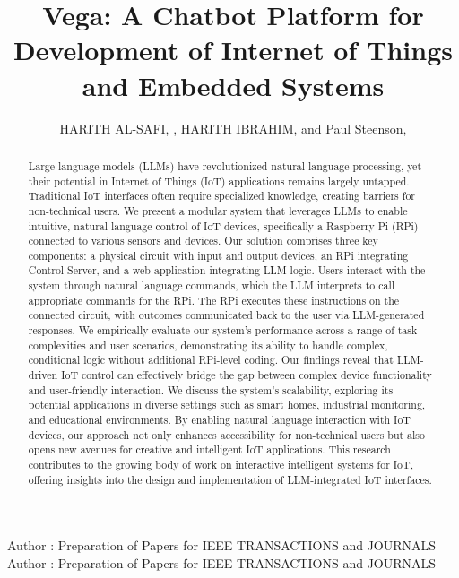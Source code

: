 \documentclass{ieeeaccess}
\begin{document}

\title{Vega: A Chatbot Platform for Development of Internet of Things and Embedded Systems}
\author{\uppercase{Harith Al-Safi}, ,
    \uppercase{Harith Ibrahim}, and Paul Steenson,
    }

\address{School of Electronics and Electrical Engineering, University of Leeds,
    Leeds LS2 9JT, U.K}

\markboth
{Author \headeretal: Preparation of Papers for IEEE TRANSACTIONS and JOURNALS}
{Author \headeretal: Preparation of Papers for IEEE TRANSACTIONS and JOURNALS}


\begin{abstract}
    Large language models (LLMs) have revolutionized natural language
    processing, yet their potential in Internet of Things (IoT) applications
    remains largely untapped. Traditional IoT interfaces often require specialized
    knowledge, creating barriers for non-technical users. We present a modular
    system that leverages LLMs to enable intuitive, natural language control of IoT
    devices, specifically a Raspberry Pi (RPi) connected to various sensors and
    devices. Our solution comprises three key components: a physical circuit with
    input and output devices, an RPi integrating Control Server, and a web
    application integrating LLM logic. Users interact with the system through
    natural language commands, which the LLM interprets to call appropriate
    commands for the RPi. The RPi executes these instructions on the connected
    circuit, with outcomes communicated back to the user via LLM-generated
    responses. We empirically evaluate our system's performance across a range of
    task complexities and user scenarios, demonstrating its ability to handle
    complex, conditional logic without additional RPi-level coding. Our findings
    reveal that LLM-driven IoT control can effectively bridge the gap between
    complex device functionality and user-friendly interaction. We discuss the
    system's scalability, exploring its potential applications in diverse settings
    such as smart homes, industrial monitoring, and educational environments. By
    enabling natural language interaction with IoT devices, our approach not only
    enhances accessibility for non-technical users but also opens new avenues for
    creative and intelligent IoT applications. This research contributes to the
    growing body of work on interactive intelligent systems for IoT, offering
    insights into the design and implementation of LLM-integrated IoT interfaces.
\end{abstract}
\end{document}
